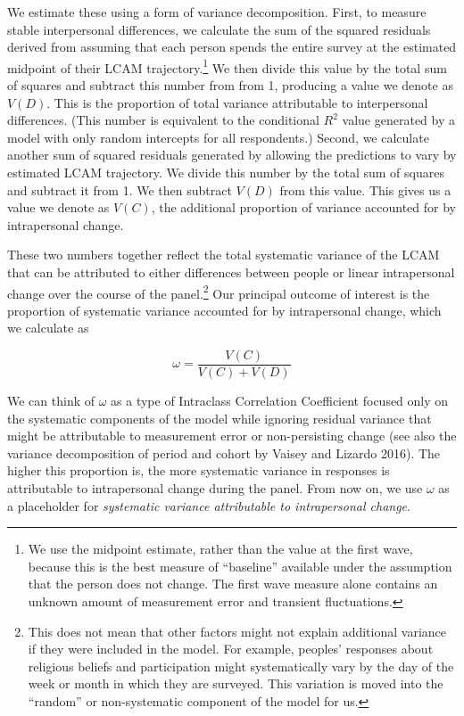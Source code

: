 \documentclass[
  12pt,
]{article}
\begin{document}
We estimate these using a form of variance decomposition. First, to
measure stable interpersonal differences, we calculate the sum of the
squared residuals derived from assuming that each person spends the
entire survey at the estimated midpoint of their LCAM
trajectory.\footnote{We use the midpoint estimate, rather than the value
  at the first wave, because this is the best measure of ``baseline''
  available under the assumption that the person does not change. The
  first wave measure alone contains an unknown amount of measurement
  error and transient fluctuations.} We then divide this value by the
total sum of squares and subtract this number from from 1, producing a
value we denote as \(V(D)\). This is the proportion of total variance
attributable to interpersonal differences. (This number is equivalent to
the conditional \(R^2\) value generated by a model with only random
intercepts for all respondents.) Second, we calculate another sum of
squared residuals generated by allowing the predictions to vary by
estimated LCAM trajectory. We divide this number by the total sum of
squares and subtract it from 1. We then subtract \(V(D)\) from this
value. This gives us a value we denote as \(V(C)\), the additional
proportion of variance accounted for by intrapersonal change.

These two numbers together reflect the total systematic variance of the
LCAM that can be attributed to either differences between people or
linear intrapersonal change over the course of the panel.\footnote{This
  does not mean that other factors might not explain additional variance
  if they were included in the model. For example, peoples' responses
  about religious beliefs and participation might systematically vary by
  the day of the week or month in which they are surveyed. This
  variation is moved into the ``random'' or non-systematic component of
  the model for us.} Our principal outcome of interest is the proportion
of systematic variance accounted for by intrapersonal change, which we
calculate as

\[
\omega = \frac{V(C)}{V(C) + V(D)}
\]

We can think of \(\omega\) as a type of Intraclass Correlation
Coefficient focused only on the systematic components of the model while
ignoring residual variance that might be attributable to measurement
error or non-persisting change (see also the variance decomposition of
period and cohort by Vaisey and Lizardo 2016). The higher this
proportion is, the more systematic variance in responses is attributable
to intrapersonal change during the panel. From now on, we use \(\omega\)
as a placeholder for \emph{systematic variance attributable to
intrapersonal change}.
\end{document}
